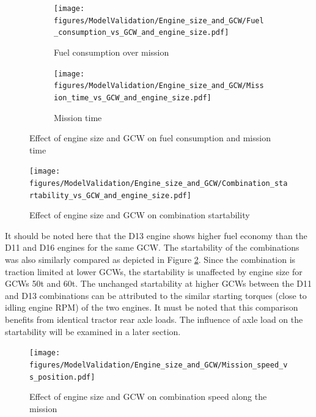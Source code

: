 \documentclass[ExampleMasters.tex]{subfiles}
\begin{document}
\begin{figure}[h!]
\begin{subfigure}{.5\textwidth}
	\centering
	\texttt{[image: figures/ModelValidation/Engine\_size\_and\_GCW/Fuel\_consumption\_vs\_GCW\_and\_engine\_size.pdf]}
	\caption{Fuel consumption over mission}
\end{subfigure}
\begin{subfigure}{.5\textwidth}
	\centering
	\texttt{[image: figures/ModelValidation/Engine\_size\_and\_GCW/Mission\_time\_vs\_GCW\_and\_engine\_size.pdf]}
	\caption{Mission time}
\end{subfigure}
\caption{Effect of engine size and GCW on fuel consumption and mission time}
\label{timeFuelGCWEngine}
\end{figure}

\begin{figure}[h!]
\centering
\texttt{[image: figures/ModelValidation/Engine\_size\_and\_GCW/Combination\_startability\_vs\_GCW\_and\_engine\_size.pdf]}
\caption{Effect of engine size and GCW on combination startability}
\label{startabilityEngineGCW}
\end{figure}

It should be noted here that the D13 engine shows higher fuel economy than the D11 and D16 engines for the same GCW. The startability of the combinations was also similarly compared as depicted in Figure \ref{startabilityEngineGCW}. Since the combination is traction limited at lower GCWs, the startability is unaffected by engine size for GCWs 50t and 60t. The unchanged startability at higher GCWs between the D11 and D13 combinations can be attributed to the similar starting torques (close to idling engine RPM) of the two engines. It must be noted that this comparison benefits from identical tractor rear axle loads. The influence of axle load on the startability will be examined in a later section.\\

\begin{figure}[h!]
\centering
\texttt{[image: figures/ModelValidation/Engine\_size\_and\_GCW/Mission\_speed\_vs\_position.pdf]}
\caption{Effect of engine size and GCW on combination speed along the mission}
\label{missionSpeedEngineSizeGCW}
\end{figure}
\end{document}
